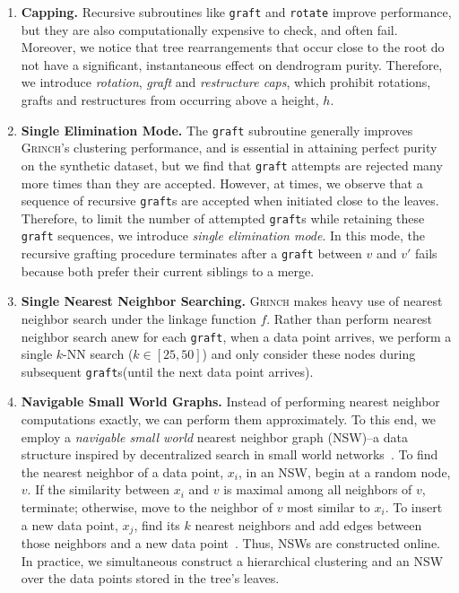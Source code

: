 \documentclass{article} \usepackage[utf8]{inputenc} \usepackage[T1]{fontenc}    \usepackage{hyperref}       \usepackage{url}            \usepackage{booktabs}       \usepackage{amsfonts}       \usepackage{nicefrac}       \usepackage{microtype}      \usepackage{geometry}
\newcommand{\alg}{\textsc{Grinch}\xspace}
\newcommand{\records}{data points\xspace}
\newcommand{\record}{data point\xspace}
\newcommand{\graft}{\texttt{graft}\xspace}
\newcommand{\grafts}{\texttt{graft}s\xspace}
\newcommand{\rotate}{\texttt{rotate}\xspace}
\begin{document}
\begin{enumerate}[noitemsep,topsep=0pt,parsep=0pt,partopsep=0pt,leftmargin=*]
\item \textbf{Capping.} Recursive subroutines like \graft and \rotate improve performance,
but they are also computationally expensive to check, and often
fail. Moreover, we notice that tree rearrangements that occur close to
the root do not have a significant, instantaneous effect on dendrogram
purity. Therefore, we introduce \emph{rotation}, \emph{graft} and
\emph{restructure caps}, which prohibit rotations, grafts and
restructures from occurring above a height, $h$.
\item \textbf{Single Elimination Mode.}
The \graft subroutine generally improves \alg's clustering
performance, and is essential in attaining perfect purity on the
synthetic dataset, but we find that \graft attempts are rejected many
more times than they are accepted. However, at times, we observe that
a sequence of recursive \grafts are accepted when initiated close to
the leaves. Therefore, to limit the number of attempted \grafts while
retaining these \graft sequences, we introduce \emph{single
  elimination mode}. In this mode, the recursive grafting procedure
terminates after a \graft between $v$ and $v'$ fails because both
prefer their current siblings to a merge.
\item \textbf{Single Nearest Neighbor Searching.}
\alg makes heavy use of nearest neighbor search under the linkage
function $f$. Rather than perform nearest neighbor search anew for
each \graft, when a \record arrives, we perform a single $k$-NN search
($k \in [25, 50]$) and only consider these nodes during subsequent
\grafts (until the next \record arrives).
\item \textbf{Navigable Small World Graphs.}
Instead of performing nearest neighbor computations exactly, we can
perform them approximately.  To this end, we employ a \emph{navigable
  small world} nearest neighbor graph (NSW)--a data structure inspired
by decentralized search in small world
networks~\cite{watts1998collective, kleinberg2000small,
  kleinberg2006complex}. To find the nearest neighbor of a
\record, $x_i$, in an NSW, begin at a random node, $v$.  If the similarity
between $x_i$ and $v$ is maximal among all neighbors of $v$,
terminate; otherwise, move to the neighbor of $v$ most similar to
$x_i$. To insert a new \record, $x_j$, find its $k$ nearest neighbors
and add edges between those neighbors and a new
\record~\cite{malkov2014approximate}. Thus, NSWs are constructed
online. In practice, we simultaneous construct a hierarchical
clustering and an NSW over the \records stored in the tree's leaves.
\end{enumerate}
\end{document}
